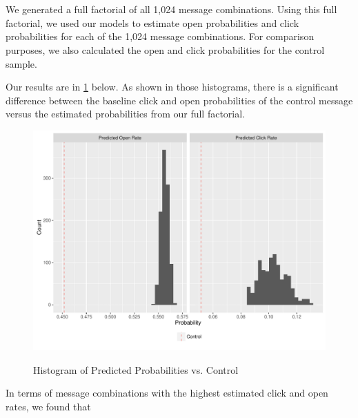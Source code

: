 \section{} %
We generated a full factorial of all 1,024 message combinations. Using this full factorial, we used our models to estimate open probabilities and click probabilities for each of the 1,024 message combinations. For comparison purposes, we also calculated the open and click probabilities for the control sample.

Our results are in \cref{fig:q3_hist} below. As shown in those histograms, there is a significant difference between the baseline click and open probabilities of the control message versus the estimated probabilities from our full factorial.

\begin{figure}[!htb]
  \centering
  \caption{Histogram of Predicted Probabilities vs. Control}
  \includegraphics[scale=0.7]{q3_hist.pdf}
  \label{fig:q3_hist}
\end{figure}

In terms of message combinations with the highest estimated click and open rates, we found that 



% 


